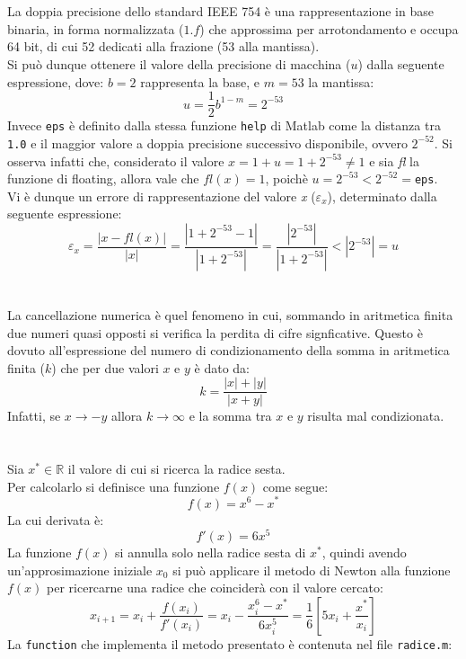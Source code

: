 \documentclass[10pt,a4paper]{article}
\begin{document}
\section{}
La doppia precisione dello standard IEEE 754 è una rappresentazione in base binaria, in forma normalizzata ($1.f$) che approssima per arrotondamento e occupa 64 bit, di cui 52 dedicati alla frazione (53 alla mantissa).\\Si può dunque ottenere il valore della precisione di macchina ($u$) dalla seguente espressione, dove: $b=2$ rappresenta la base, e $m=53$ la mantissa:$$u = \frac{1}{2}b^{1-m} = 2^{-53}$$
Invece \texttt{eps} è definito dalla stessa funzione \texttt{help} di Matlab come 	la distanza tra \texttt{1.0} e il maggior valore a doppia precisione successivo disponibile, ovvero $ 2^{-52} $.
Si osserva infatti che, considerato il valore $x = 1+u = 1+2^{-53}\neq 1 $ e sia \textit{fl} la funzione di floating, allora vale che $fl(x)=1 $, poichè $u=2^{-53}<2^{-52}=$\texttt{eps}.\\Vi è dunque un errore di rappresentazione del valore \textit{x} ($\varepsilon_x$), determinato dalla seguente espressione:$$\varepsilon_x=\frac{|x-fl(x)|}{|x|}=\frac{|1+2^{-53}-1|}{|1+2^{-53}|}=\frac{|2^{-53}|}{|1+2^{-53}|}<|2^{-53}|=u$$
\section{}La cancellazione numerica è quel fenomeno in cui, sommando in aritmetica finita due numeri quasi opposti si verifica la perdita di cifre signficative. Questo è dovuto all'espressione del numero di condizionamento della somma in aritmetica finita ($k$) che per due valori $x$ e $y$ è dato da:$$k = \frac{|x|+|y|}{|x+y|}$$Infatti, se $x\rightarrow-y$ allora $k\rightarrow\infty$ e la somma tra $x$ e $y$ risulta mal condizionata.
\section{}
Sia $x^*\in\mathbb{R}$ il valore di cui si ricerca la radice sesta.\\
Per calcolarlo si definisce una funzione $f(x)$ come segue:
$$f(x) = x^6-x^*$$La cui derivata è:$$f'(x)=6x^5$$La funzione $f(x)$ si annulla solo nella radice sesta di $x^*$, quindi avendo un'approsimazione iniziale $x_0$ si può applicare il metodo di Newton alla funzione $f(x)$ per ricercarne una radice che coinciderà con il valore cercato:
$$x_{i+1}=x_i+\frac{f(x_i)}{f'(x_i)}=x_i-\frac{x_i^6-x^*}{6x_i^5}=\frac{1}{6}\left[5x_i+\frac{x^*}{x_i}\right]$$
La \texttt{function} che implementa il metodo presentato è contenuta nel file \texttt{radice.m}:
\end{document}
